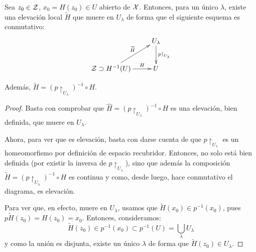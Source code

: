 \begin{lem}
	\label{grf_lema_elevacion_local}
	Sea $z_0\in\mathcal{Z}$, $x_0=H(z_0)\in U$ abierto de $\mathcal{X}$. Entonces, para un único $\lambda$, existe una elevación local $\widetilde{H}$ que muere en $U_\lambda$ de forma que el siguiente esquema es conmutativo:
	\[\xymatrix{
		& U_\lambda \ar[d]^{p\restriction_{U_\lambda}} \\
		\mc{Z}\supset H^{-1}(U) \ar[ru]^-{\widetilde{H}} \ar[r]^-H & U
	}\]

	Además, $\widetilde{H}=(p\restriction_{U_\lambda})^{-1}\circ H$.
	
	\begin{proof}
		Basta con comprobar que $\widehat{H}=(p\restriction_{U_\lambda})^{-1}\circ H$ es una elevación, bien definida, que muere en $U_\lambda$. 
		
		Ahora, para ver que es elevación, basta con darse cuenta de que $p\restriction_{U_\lambda}$ es un homeomorfismo por definición de espacio recubridor. Entonces, no solo está bien definida (por existir la inversa de $p\restriction_{U_\lambda}$), sino que además la composición $\widetilde{H} = (p\restriction_{U_\lambda})^{-1}\circ H$ es continua y como, desde luego, hace conmutativo el diagrama, es elevación.
		
		Para ver que, en efecto, muere en $U_\lambda$, usamos que $\widetilde{H}(x_0)\in p^{-1}(x_0)$, pues $p\widetilde{H}(z_0)=H(z_0)=x_0$. Entonces, consideramos:
		\[\widetilde{H}(z_0)\in p^{-1}(x_0)\subset p^{-1}(U)=\bigcup_\lambda U_\lambda\]
		y como la unión es disjunta, existe un único $\lambda$ de forma que $\widetilde{H}(z_0)\in U_\lambda$.
	\end{proof}
\end{lem}

